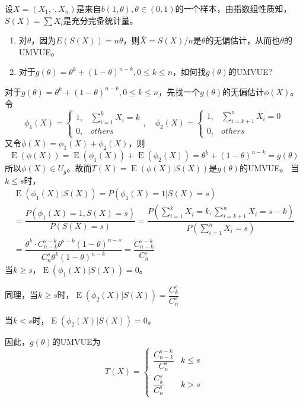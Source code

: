 \begin{example}
    设$X = (X_1,\cdot,X_n)$是来自$b(1,\theta),\theta\in(0,1)$的一个样本，由指数组性质知，$S(X)=\sum X_i$是充分完备统计量。
    \begin{enumerate}
        \item 对$\theta$，因为$E(S(X)) = n\theta$，则$\bar{X} = S(X)/n$是$\theta$的无偏估计，从而也$\theta$的UMVUE。
        \item 对于$g(\theta) = \theta^k + (1-\theta)^{n-k},0\leq k\leq n$，如何找$g(\theta)$的UMVUE?
    \end{enumerate}
    对于$g(\theta) = \theta^k + (1-\theta)^{n-k},0\leq k\leq n$，先找一个$g(\theta)$的无偏估计$\phi(X)$。令
    \[
        \phi_1(X)=\begin{cases}1,&\sum\limits_{i=1}^kX_i=k\\0,&others\end{cases},\quad
        \phi_2(X)=\begin{cases}1,&\sum\limits_{i=k+1}^nX_i=0\\0,&others\end{cases}
    \]
    又令$\phi(X) = \phi_1(X) + \phi_2(X)$，则
    \[
        \operatorname{E}(\phi(X)) = \operatorname{E}(\phi_1(X))+\operatorname{E}(\phi_2(X)) = \theta^k + (1-\theta)^{n-k} = g(\theta)
    \]
    所以$\phi(X)\in U_g$。故而$T(X) = \operatorname{E}(\phi(X)|S(X))$是$g(\theta)$的UMVUE。
    当$k\leq s$时，
    \[
        \begin{array}{l}
            \operatorname{E}(\phi_1(X)|S(X)) = P(\phi_1(X) = 1|S(X) = s)\\
            =\dfrac{P(\phi_1(X) = 1,S(X) = s)}{P(S(X) = s)} = \dfrac{P(\sum\limits_{i=1}^kX_i=k,\sum\limits_{i = k+1}^{n}X_i = s-k)}{P(\sum\limits_{i = 1}^{n}X_i = s)}\\
            =\dfrac{\theta^k\cdot C_{n-k}^{s-k}\theta^{s-k}(1-\theta)^{n-s}}{C_{n}^{s}\theta^k(1-\theta)^{n-k}} = \dfrac{C_{n-k}^{s-k}}{C_{n}^{s}} 
        \end{array}   
    \]
    当$k\geq s$，$\operatorname{E}(\phi_1(X)|S(X)) = 0$。

    同理，当$k\geq s$时，$\operatorname{E}(\phi_2(X)|S(X)) = \dfrac{C_{k}^{s}}{C_{n}^{s}}$
    
    当$k < s$时，$\operatorname{E}(\phi_2(X)|S(X)) = 0$。

    因此，$g(\theta)$的UMVUE为
    \[
        T(X) = \left\{
            \begin{array}{ll}
                \dfrac{C_{n-k}^{s-k}}{C_{n}^{s}} & k\leq s\\
                \dfrac{C_{k}^{s}}{C_{n}^{s}} & k>s
            \end{array}
        \right.
    \]
\end{example}
